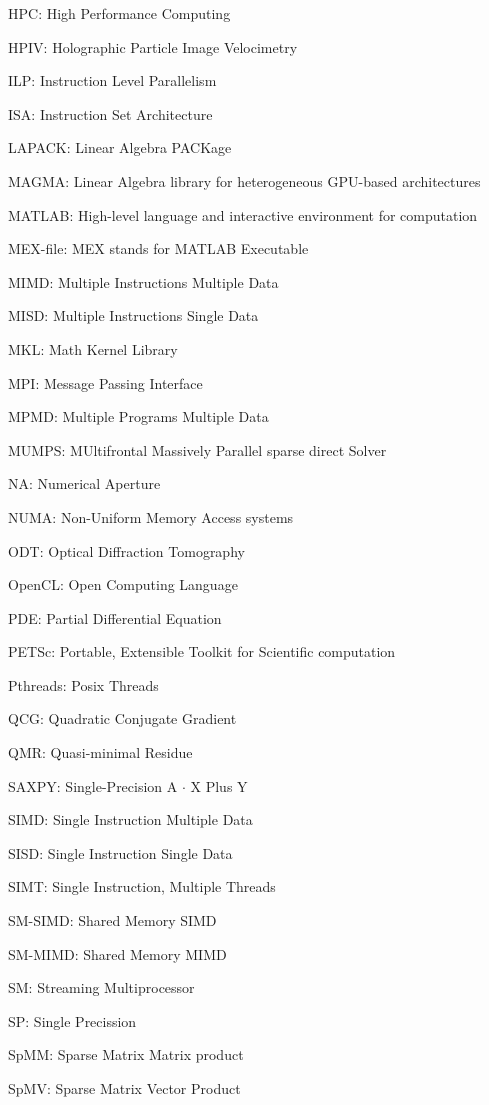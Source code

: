 HPC: High Performance Computing

HPIV: Holographic Particle Image Velocimetry

ILP: Instruction Level Parallelism

ISA: Instruction Set Architecture

LAPACK: Linear Algebra PACKage

MAGMA: Linear Algebra library for heterogeneous GPU-based architectures

MATLAB: High-level language and interactive environment for computation

MEX-file: MEX stands for MATLAB Executable

MIMD: Multiple Instructions Multiple Data

MISD: Multiple Instructions Single Data

MKL: Math Kernel Library

MPI: Message Passing Interface

MPMD: Multiple Programs  Multiple Data

MUMPS: MUltifrontal Massively Parallel sparse direct Solver

NA: Numerical Aperture

NUMA: Non-Uniform Memory Access systems

ODT: Optical Diffraction Tomography

OpenCL: Open Computing Language

PDE: Partial Differential Equation

PETSc: Portable, Extensible Toolkit for Scientific computation

Pthreads: Posix Threads

QCG: Quadratic Conjugate Gradient

QMR: Quasi-minimal Residue

SAXPY: Single-Precision A $\cdot$ X Plus Y

SIMD: Single Instruction Multiple Data

SISD: Single Instruction Single Data

SIMT: Single Instruction, Multiple Threads

SM-SIMD: Shared Memory SIMD

SM-MIMD: Shared Memory MIMD

SM: Streaming Multiprocessor

SP: Single Precission

SpMM: Sparse Matrix Matrix product

SpMV: Sparse Matrix Vector Product

